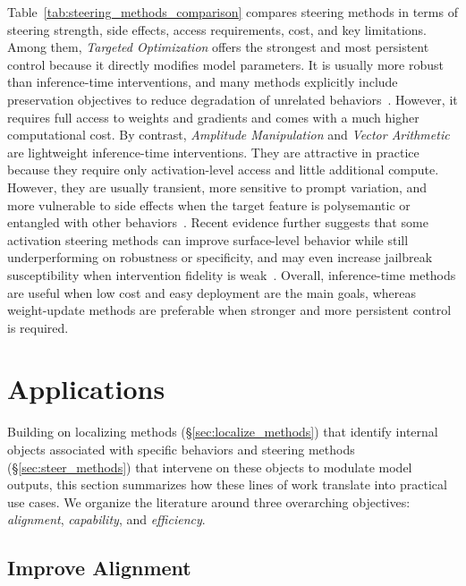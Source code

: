 \documentclass[11pt,letterpaper]{mystyle}
\begin{document}
\begin{tcolorbox}[takeawaysbox, title={Comparative Analysis of Steering Methods}]
  Table~\ref{tab:steering_methods_comparison} compares steering methods in terms of steering strength, side effects, access requirements, cost, and key limitations.
  Among them, \textit{Targeted Optimization} offers the strongest and most persistent control because it directly modifies model parameters. It is usually more robust than inference-time interventions, and many methods explicitly include preservation objectives to reduce degradation of unrelated behaviors~\citep{meng2022ccs,meng2023massediting,zhang2024cofitune}. However, it requires full access to weights and gradients and comes with a much higher computational cost. 
  By contrast, \textit{Amplitude Manipulation} and \textit{Vector Arithmetic} are lightweight inference-time interventions. They are attractive in practice because they require only activation-level access and little additional compute. However, they are usually transient, more sensitive to prompt variation, and more vulnerable to side effects when the target feature is polysemantic or entangled with other behaviors~\citep{rimsky-etal-2024-steering,Tan2024}. Recent evidence further suggests that some activation steering methods can improve surface-level behavior while still underperforming on robustness or specificity, and may even increase jailbreak susceptibility when intervention fidelity is weak~\citep{Goyal2026,raedler2025the}.
  Overall, inference-time methods are useful when low cost and easy deployment are the main goals, whereas weight-update methods are preferable when stronger and more persistent control is required.
  \end{tcolorbox}


\newpage

\section{Applications}
\label{sec:applications}
Building on localizing methods (§\ref{sec:localize_methods}) that identify internal objects associated with specific behaviors and steering methods (§\ref{sec:steer_methods}) that intervene on these objects to modulate model outputs, this section summarizes how these lines of work translate into practical use cases. 
We organize the literature around three overarching objectives: \textit{alignment}, \textit{capability}, and \textit{efficiency}. 

\subsection{Improve Alignment}
\label{sec:improve_alignment}
\end{document}
